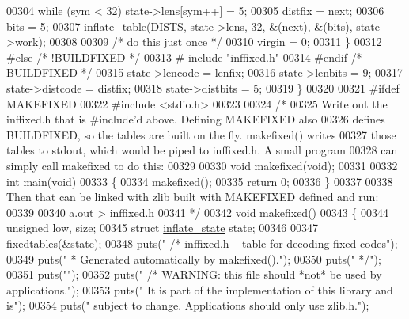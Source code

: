 \begin{DoxyCode}
00304         \textcolor{keywordflow}{while} (sym < 32) state->lens[sym++] = 5;
00305         distfix = next;
00306         bits = 5;
00307         inflate\_table(DISTS, state->lens, 32, &(next), &(bits), state->work);
00308 
00309         \textcolor{comment}{/* do this just once */}
00310         virgin = 0;
00311     \}
00312 \textcolor{preprocessor}{#else }\textcolor{comment}{/* !BUILDFIXED */}\textcolor{preprocessor}{}
00313 \textcolor{preprocessor}{#   include "inffixed.h"}
00314 \textcolor{preprocessor}{#endif }\textcolor{comment}{/* BUILDFIXED */}\textcolor{preprocessor}{}
00315     state->lencode = lenfix;
00316     state->lenbits = 9;
00317     state->distcode = distfix;
00318     state->distbits = 5;
00319 \}
00320 
00321 \textcolor{preprocessor}{#ifdef MAKEFIXED}
00322 \textcolor{preprocessor}{#include <stdio.h>}
00323 
00324 \textcolor{comment}{/*}
00325 \textcolor{comment}{   Write out the inffixed.h that is #include'd above.  Defining MAKEFIXED also}
00326 \textcolor{comment}{   defines BUILDFIXED, so the tables are built on the fly.  makefixed() writes}
00327 \textcolor{comment}{   those tables to stdout, which would be piped to inffixed.h.  A small program}
00328 \textcolor{comment}{   can simply call makefixed to do this:}
00329 \textcolor{comment}{}
00330 \textcolor{comment}{    void makefixed(void);}
00331 \textcolor{comment}{}
00332 \textcolor{comment}{    int main(void)}
00333 \textcolor{comment}{    \{}
00334 \textcolor{comment}{        makefixed();}
00335 \textcolor{comment}{        return 0;}
00336 \textcolor{comment}{    \}}
00337 \textcolor{comment}{}
00338 \textcolor{comment}{   Then that can be linked with zlib built with MAKEFIXED defined and run:}
00339 \textcolor{comment}{}
00340 \textcolor{comment}{    a.out > inffixed.h}
00341 \textcolor{comment}{ */}
00342 \textcolor{keywordtype}{void} makefixed()
00343 \{
00344     \textcolor{keywordtype}{unsigned} low, size;
00345     \textcolor{keyword}{struct }\hyperlink{structinflate__state}{inflate\_state} state;
00346 
00347     fixedtables(&state);
00348     puts(\textcolor{stringliteral}{"    /* inffixed.h -- table for decoding fixed codes"});
00349     puts(\textcolor{stringliteral}{"     * Generated automatically by makefixed()."});
00350     puts(\textcolor{stringliteral}{"     */"});
00351     puts(\textcolor{stringliteral}{""});
00352     puts(\textcolor{stringliteral}{"    /* WARNING: this file should *not* be used by applications."});
00353     puts(\textcolor{stringliteral}{"       It is part of the implementation of this library and is"});
00354     puts(\textcolor{stringliteral}{"       subject to change. Applications should only use zlib.h."});

\end{DoxyCode}
